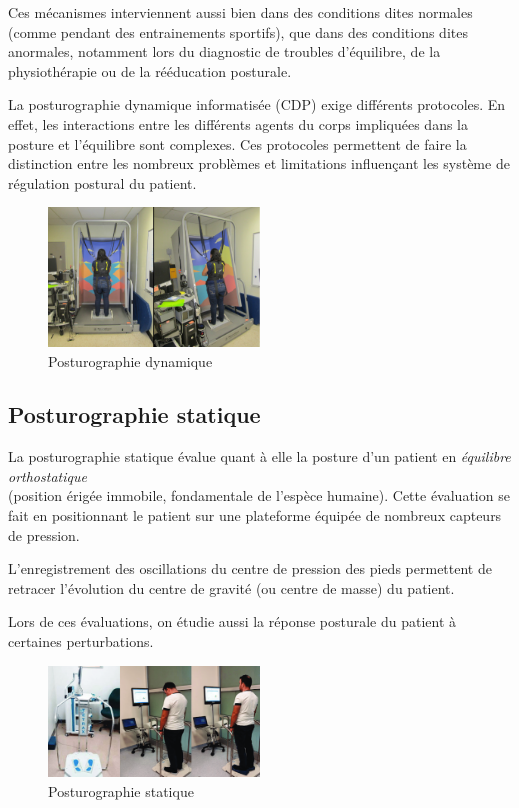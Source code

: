 Ces mécanismes interviennent aussi bien dans des conditions dites normales (comme pendant des entrainements sportifs), que dans des conditions dites anormales, notamment lors du diagnostic de troubles d'équilibre, de la physiothérapie ou de la rééducation posturale.

La posturographie dynamique informatisée (CDP) exige différents protocoles.
En effet, les interactions entre les différents agents du corps impliquées dans la posture et l’équilibre sont complexes.
Ces protocoles permettent de faire la distinction entre les nombreux problèmes et limitations influençant les système de régulation postural du patient.

\begin{figure}[ht]
    \centering
    \includegraphics[width=0.5\textwidth]{images/introduction/dynamique.png}
    \caption{Posturographie dynamique}
    \label{fig:posturographie-dynamique}
\end{figure}

\subsection{Posturographie statique}

La posturographie statique évalue quant à elle la posture d'un patient en \textit{équilibre orthostatique} \\ (position érigée immobile, fondamentale de l'espèce humaine).
Cette évaluation se fait en positionnant le patient sur une plateforme équipée de nombreux capteurs de pression.

L'enregistrement des oscillations du centre de pression des pieds permettent de retracer l'évolution du centre de gravité (ou centre de masse) du patient.

Lors de ces évaluations, on étudie aussi la réponse posturale du patient à certaines perturbations.

\begin{figure}[ht]
    \centering
    \includegraphics[width=0.5\textwidth]{images/introduction/statique.png}
    \caption{Posturographie statique}
    \label{fig:posturographie-statique}
\end{figure}